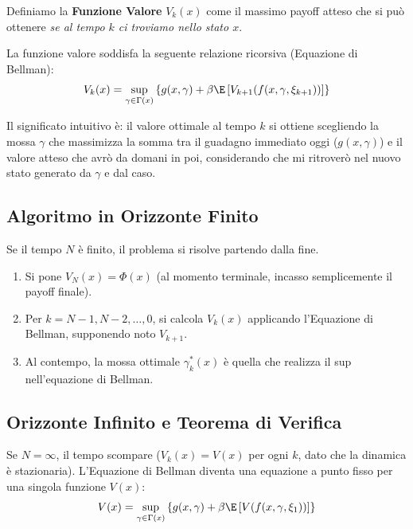 Definiamo la \textbf{Funzione Valore} $V_k(x)$ come il massimo payoff atteso che si può ottenere \emph{se al tempo $k$ ci troviamo nello stato $x$}.

\begin{theorem}
La funzione valore soddisfa la seguente relazione ricorsiva (Equazione di Bellman):
\[ V_k(x) = \sup_{\gamma \in \Gamma(x)} \left\{ g(x, \gamma) + \beta \E \left[ V_{k+1}(f(x, \gamma, \xi_{k+1})) \right] \right\} \]
\end{theorem}

\begin{hint}
Il significato intuitivo è: il valore ottimale al tempo $k$ si ottiene scegliendo la mossa $\gamma$ che massimizza la somma tra il guadagno immediato oggi ($g(x, \gamma)$) e il valore atteso che avrò da domani in poi, considerando che mi ritroverò nel nuovo stato generato da $\gamma$ e dal caso.
\end{hint}

\subsection{Algoritmo in Orizzonte Finito}
Se il tempo $N$ è finito, il problema si risolve partendo dalla fine.
\begin{enumerate}
    \item Si pone $V_N(x) = \Phi(x)$ (al momento terminale, incasso semplicemente il payoff finale).
    \item Per $k = N-1, N-2, \dots, 0$, si calcola $V_k(x)$ applicando l'Equazione di Bellman, supponendo noto $V_{k+1}$.
    \item Al contempo, la mossa ottimale $\gamma^*_k(x)$ è quella che realizza il sup nell'equazione di Bellman.
\end{enumerate}

\subsection{Orizzonte Infinito e Teorema di Verifica}
Se $N = \infty$, il tempo scompare ($V_k(x) = V(x)$ per ogni $k$, dato che la dinamica è stazionaria). L'Equazione di Bellman diventa una equazione a punto fisso per una singola funzione $V(x)$:
\[ V(x) = \sup_{\gamma \in \Gamma(x)} \left\{ g(x, \gamma) + \beta \E \left[ V(f(x, \gamma, \xi_1)) \right] \right\} \]

